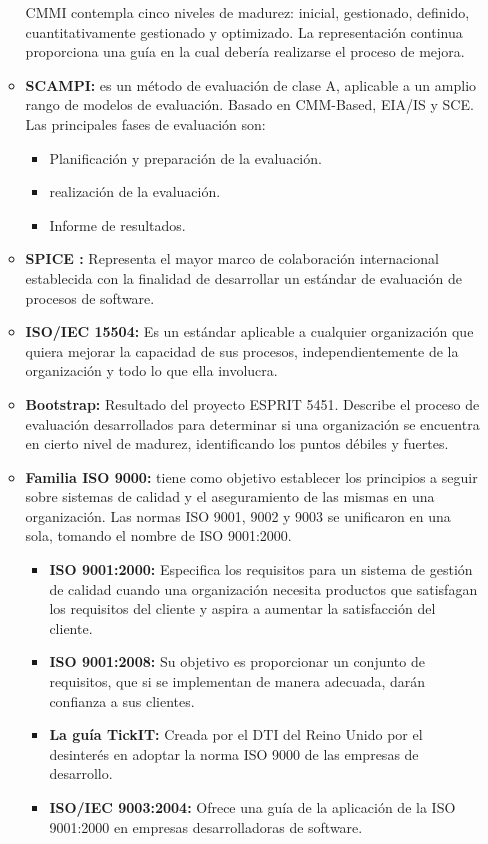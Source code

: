 \documentclass[a4paper,12pt]{article}
\begin{document}
\begin{enumerate}
\begin{itemize}
  CMMI contempla cinco niveles de madurez: inicial, gestionado, definido, cuantitativamente gestionado y optimizado.
  La representación continua proporciona una guía en la cual debería realizarse el proceso de mejora.
  \item \textbf{SCAMPI: } es un método de evaluación de clase A, aplicable a un amplio rango de modelos de evaluación. Basado en CMM-Based, EIA/IS y SCE.
  Las principales fases de evaluación son:
  \begin{itemize}
   \item Planificación y preparación de la evaluación.
   \item realización de la evaluación.
   \item Informe de resultados.
  \end{itemize}
  \item \textbf{SPICE :} Representa el mayor marco de colaboración internacional establecida con la finalidad de desarrollar un estándar de evaluación de procesos de software.
  \item \textbf{ISO/IEC 15504: } Es un estándar aplicable a cualquier organización que quiera mejorar la capacidad de sus procesos, independientemente de la organización y todo lo que ella involucra.
  \item \textbf{Bootstrap: } Resultado del proyecto ESPRIT 5451. Describe el proceso de evaluación desarrollados para determinar si una organización se encuentra en cierto nivel de madurez, 
  identificando los puntos débiles y fuertes.
  \item \textbf{Familia ISO 9000: } tiene como objetivo establecer los principios a seguir sobre sistemas de calidad y el aseguramiento de las mismas en una organización.
  Las normas ISO 9001, 9002 y 9003 se unificaron en una sola, tomando el nombre de ISO 9001:2000.
  \begin{itemize}
   \item \textbf{ISO 9001:2000: } Especifica los requisitos para un sistema de gestión de calidad cuando una organización necesita productos que satisfagan los requisitos del cliente y aspira 
   a aumentar la satisfacción del cliente.
   \item \textbf{ISO 9001:2008: } Su objetivo es proporcionar un conjunto de requisitos, que si se implementan de manera adecuada, darán confianza a sus clientes.
   \item \textbf{La guía TickIT: } Creada por el DTI del Reino Unido por el desinterés en adoptar la norma ISO 9000 de las empresas de desarrollo.
   \item \textbf{ISO/IEC 9003:2004: } Ofrece una guía de la aplicación de la ISO 9001:2000 en empresas desarrolladoras de software.

\end{itemize}
\end{itemize}
\end{enumerate}
\end{document}
